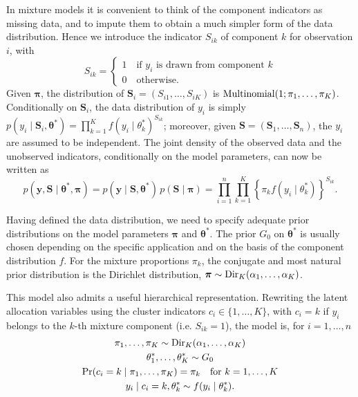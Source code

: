 In mixture models it is convenient to think of the component indicators as missing data, and to impute them to obtain a much simpler form of the data distribution. Hence we introduce the indicator $S_{ik}$ of component $k$ for observation $i$, with 
\begin{equation*}
S_{ik} = \begin{cases}
1 \quad \text{if $y_i$ is drawn from component $k$}\\
0 \quad \text{otherwise}.
\end{cases}
\end{equation*}
Given $\bm{\pi}$, the distribution of $\bm{S}_i = (S_{i1},\dots,S_{iK})$ is $\mathrm{Multinomial}(1;\pi_1,\dots,\pi_K)$. 
Conditionally on $\bm{S}_{i}$, the data distribution of $y_i$ is simply $p(y_i\mid \bm{S}_i,\bm{\theta}^*) = \prod_{k=1}^K f(y_i\mid\theta_k^*)^{S_{ik}}$; moreover, given $\bm{S}=(\bm{S}_1,\dots,\bm{S}_n)$, the $y_i$ are assumed to be independent.
The joint density of the observed data and the unobserved indicators, conditionally on the model parameters, can now be written as 
\begin{equation*}
p(\bm{y},\bm{S}\mid \bm{\theta}^*,\bm{\pi}) = p(\bm{y}\mid\bm{S},\bm{\theta}^*)\, p(\bm{S}\mid\bm{\pi}) = 
\prod_{i=1}^n \prod_{k=1}^K \left\{ \pi_k f(y_i\mid\theta_k^*) \right\}^{S_{ik}}.
\end{equation*}

Having defined the data distribution, we need to specify adequate prior distributions on the model parameters $\bm{\pi}$ and $\bm{\theta}^*$. The prior $G_0$ on $\bm{\theta}^*$ is usually chosen depending on the specific application and on the basis of the component distribution $f$. For the mixture proportions $\pi_k$, the conjugate and most natural prior distribution is the Dirichlet distribution, $\bm{\pi}\sim \mathrm{Dir}_K(\alpha_1,\dots,\alpha_K)$.

This model also admits a useful hierarchical representation. Rewriting the latent allocation variables using the cluster indicators $c_i\in\{1,\dots,K\}$, with $c_i=k$ if $y_i$ belongs to the $k$-th mixture component (i.e. $S_{ik} = 1$), the model is, for $i = 1,\dots,n$ 
\begin{equation}
\begin{gathered}
\pi_1,\dots,\pi_K  \sim \Dir_K(\alpha_1,\dots,\alpha_K)\\
\theta^*_1,\dots,\theta^*_K \sim G_0\\
\Pr(c_i = k \mid \pi_1,\dots,\pi_K) = \pi_k \quad \text{for } k = 1,\dots,K\\ 
y_i \mid c_i = k, \theta^*_k \sim f(y_i\mid\theta^*_k).
\end{gathered}
\label{eq:ch1_finitemix_h1}
\end{equation}

